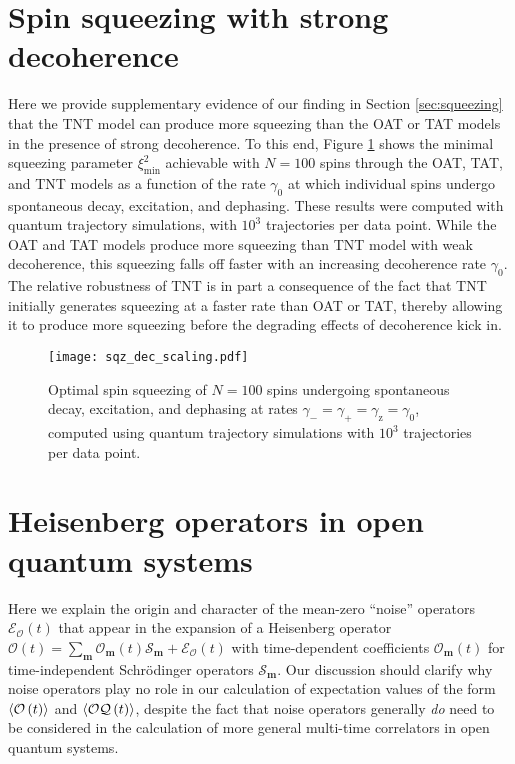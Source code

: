 \documentclass[aps,pra,twocolumn,longbibliography]{revtex4-2}
\renewcommand{\t}{\text} %
\newcommand{\p}[1]{\left( #1 \right)} %
\renewcommand{\v}{\bm} %
\newcommand{\bk}{\braket} %
\newcommand{\E}{\mathcal{E}}
\renewcommand{\O}{\mathcal{O}}
\newcommand{\Q}{\mathcal{Q}}
\renewcommand{\S}{\mathcal{S}}
\newcommand{\z}{\text{z}}
\newcommand{\1}{\mathds{1}}
\begin{document}
\section{Spin squeezing with strong decoherence}
\label{sec:strong_dec}

Here we provide supplementary evidence of our finding in Section
\ref{sec:squeezing} that the TNT model can produce more squeezing than
the OAT or TAT models in the presence of strong decoherence.  To this
end, Figure \ref{fig:sqz_dec_scaling} shows the minimal squeezing
parameter $\xi^2_{\t{min}}$ achievable with $N=100$ spins through the
OAT, TAT, and TNT models as a function of the rate $\gamma_0$ at which
individual spins undergo spontaneous decay, excitation, and dephasing.
These results were computed with quantum trajectory simulations, with
$10^3$ trajectories per data point.  While the OAT and TAT models
produce more squeezing than TNT model with weak decoherence, this
squeezing falls off faster with an increasing decoherence rate
$\gamma_0$.  The relative robustness of TNT is in part a consequence
of the fact that TNT initially generates squeezing at a faster rate
than OAT or TAT, thereby allowing it to produce more squeezing before
the degrading effects of decoherence kick in.

\begin{figure}
  \centering
  \texttt{[image: sqz\_dec\_scaling.pdf]}
  \caption{Optimal spin squeezing of $N=100$ spins undergoing
    spontaneous decay, excitation, and dephasing at rates
    $\gamma_-=\gamma_+=\gamma_\z=\gamma_0$, computed using quantum
    trajectory simulations with $10^3$ trajectories per data point.}
  \label{fig:sqz_dec_scaling}
\end{figure}

\section{Heisenberg operators in open quantum systems}
\label{sec:noise}

Here we explain the origin and character of the mean-zero ``noise''
operators $\E_\O\p{t}$ that appear in the expansion of a Heisenberg
operator $\O\p{t}=\sum_{\v m}\O_{\v m}\p{t}\S_{\v m}+\E_\O\p{t}$ with
time-dependent coefficients $\O_{\v m}\p{t}$ for time-independent
Schr\"odinger operators $\S_{\v m}$.  Our discussion should clarify
why noise operators play no role in our calculation of expectation
values of the form $\bk{\O\p{t}}$ and $\bk{\O\Q\p{t}}$, despite the
fact that noise operators generally {\it do} need to be considered in
the calculation of more general multi-time correlators in open quantum
systems\cite{blocher2019quantum}.
\end{document}
